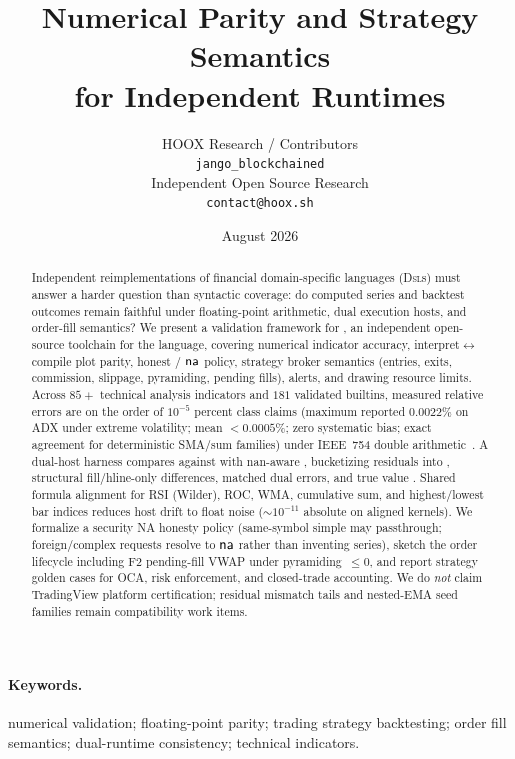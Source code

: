 \documentclass[11pt,a4paper]{article}
\title{%
  Numerical Parity and Strategy Semantics\\
  for Independent \pine{} Runtimes%
}
\author{%
  HOOX Research / \pyne{} Contributors\\
  \texttt{jango\_blockchained}\\
  Independent Open Source Research\\
  \texttt{contact@hoox.sh}%
}
\date{August 2026}
\begin{document}
\maketitle

\begin{abstract}
Independent reimplementations of financial domain-specific languages (\textsc{Dsl}s)
must answer a harder question than syntactic coverage: do computed series and
backtest outcomes remain faithful under floating-point arithmetic, dual execution
hosts, and order-fill semantics?
We present a validation framework for \pyne{}, an independent open-source toolchain
for the \pine{} language, covering numerical indicator accuracy, interpret$\leftrightarrow$compile
plot parity, honest  / $\textsf{na}$ policy, strategy broker semantics
(entries, exits, commission, slippage, pyramiding, pending fills), alerts, and
drawing resource limits.
Across $85+$ technical analysis indicators and $181$ validated builtins, measured
relative errors are on the order of $10^{-5}$ percent class claims (maximum reported
$0.0022\%$ on ADX under extreme volatility; mean $<0.0005\%$; zero systematic bias;
exact agreement for deterministic SMA/sum families) under IEEE~754 double
arithmetic~\citep{ieee754,higham2002accuracy}.
A dual-host harness compares  against
 with nan-aware , bucketizing residuals into
, structural fill/hline-only differences, matched dual errors, and true
value .
Shared formula alignment for RSI (Wilder), ROC, WMA, cumulative sum, and
highest/lowest bar indices reduces host drift to float noise
($\sim\!10^{-11}$ absolute on aligned kernels).
We formalize a security NA honesty policy (same-symbol simple \ohlcv{} may
passthrough; foreign/complex requests resolve to $\textsf{na}$ rather than inventing
series), sketch the order lifecycle including F2 pending-fill VWAP under
pyramiding~$\le 0$, and report strategy golden cases for OCA, risk enforcement,
and closed-trade accounting.
We do \emph{not} claim TradingView platform certification; residual mismatch
tails and nested-EMA seed families remain compatibility work items.
\end{abstract}

\paragraph{Keywords.}
numerical validation; floating-point parity; trading strategy backtesting;
order fill semantics; dual-runtime consistency; technical indicators.
\end{document}
